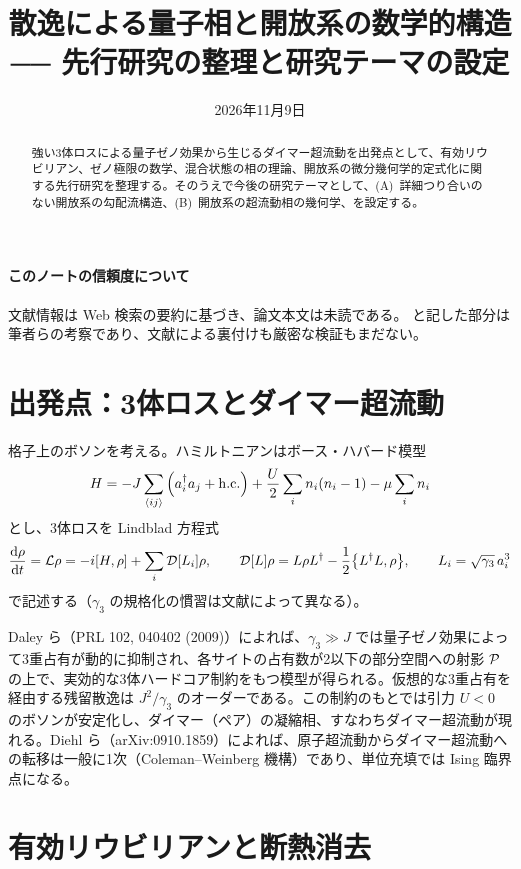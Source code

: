 \documentclass[11pt]{ltjsarticle}
\title{散逸による量子相と開放系の数学的構造\\ ── 先行研究の整理と研究テーマの設定}
\date{2026年11月9日}
\begin{document}
\maketitle

\begin{abstract}
強い3体ロスによる量子ゼノ効果から生じるダイマー超流動を出発点として、有効リウビリアン、ゼノ極限の数学、混合状態の相の理論、開放系の微分幾何学的定式化に関する先行研究を整理する。そのうえで今後の研究テーマとして、(A)~詳細つり合いのない開放系の勾配流構造、(B)~開放系の超流動相の幾何学、を設定する。
\end{abstract}

\paragraph{このノートの信頼度について}
文献情報は Web 検索の要約に基づき、論文本文は未読である。\unverified{} と記した部分は筆者らの考察であり、文献による裏付けも厳密な検証もまだない。

\section{出発点：3体ロスとダイマー超流動}

格子上のボソンを考える。ハミルトニアンはボース・ハバード模型
\begin{equation}
H = -J\sum_{\langle ij\rangle}\qty(a_i^\dagger a_j + \mathrm{h.c.}) + \frac{U}{2}\sum_i n_i(n_i-1) - \mu\sum_i n_i
\end{equation}
とし、3体ロスを Lindblad 方程式
\begin{equation}
\dv{\rho}{t} = \mathcal{L}\rho = -i[H,\rho] + \sum_i \mathcal{D}[L_i]\rho,\qquad
\mathcal{D}[L]\rho = L\rho L^\dagger - \frac12\qty{L^\dagger L,\rho},\qquad
L_i = \sqrt{\gamma_3}\,a_i^3
\label{eq:lindblad}
\end{equation}
で記述する（$\gamma_3$ の規格化の慣習は文献によって異なる）。

Daley ら（PRL 102, 040402 (2009)）によれば、$\gamma_3 \gg J$ では量子ゼノ効果によって3重占有が動的に抑制され、各サイトの占有数が2以下の部分空間への射影 $\mathcal{P}$ の上で、実効的な3体ハードコア制約をもつ模型が得られる。仮想的な3重占有を経由する残留散逸は $J^2/\gamma_3$ のオーダーである。この制約のもとでは引力 $U<0$ のボソンが安定化し、ダイマー（ペア）の凝縮相、すなわちダイマー超流動が現れる。Diehl ら（arXiv:0910.1859）によれば、原子超流動からダイマー超流動への転移は一般に1次（Coleman--Weinberg 機構）であり、単位充填では Ising 臨界点になる。

\section{有効リウビリアンと断熱消去}
\end{document}
